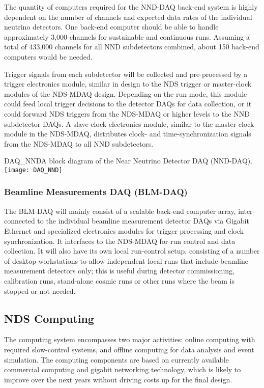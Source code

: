The quantity of computers required for the NND-DAQ back-end system is highly dependent on the 
number of channels and expected data rates of the individual neutrino detectors. 
One back-end computer should be able to handle 
approximately 3,000 channels for sustainable and continuous runs. Assuming a total of 
433,000 channels for all NND subdetectors combined, about 150 back-end computers would be 
needed.

Trigger signals from each subdetector will be collected and pre-processed by a 
trigger electronics module, similar in design to the NDS  trigger or master-clock modules 
of the NDS-MDAQ design. Depending on the run mode, this module could feed local 
trigger 
decisions to the detector DAQs for data collection, or it could forward NDS triggers 
from the NDS-MDAQ or higher levels to the NND subdetector DAQs.  A slave-clock electronics 
module, similar to the master-clock module in the NDS-MDAQ, distributes clock- and 
time-synchronization signals from the NDS-MDAQ to all NND subdetectors.


\begin{cdrfigure}{DAQ_NND}{A block diagram of the Near Neutrino Detector DAQ (NND-DAQ).}
\texttt{[image: DAQ\_NND]}
\end{cdrfigure}


\subsubsection{Beamline Measurements DAQ (BLM-DAQ)}

The BLM-DAQ will mainly consist of a scalable back-end 
computer array, inter-connected to the individual beamline measurement detector DAQs via 
Gigabit Ethernet and specialized electronics modules for trigger processing and clock 
synchronization. It interfaces to the NDS-MDAQ for run control and 
data collection. It will also have its own local run-control setup, consisting of a number 
of desktop workstations to allow independent local runs that include beamline measurement 
detectors only; this is useful during detector commissioning, calibration runs, stand-alone cosmic 
runs or other runs where the beam is stopped or not needed.


\subsection{NDS Computing}
\label{cdrsec:nd-gdaq-global-computing}

The computing system encompasses two major activities: online computing with required 
slow-control systems, and offline computing for data analysis and event simulation.
The computing components are based 
on currently available commercial computing and gigabit networking technology, which is 
likely to improve over the next years without driving costs up for the final design.  

